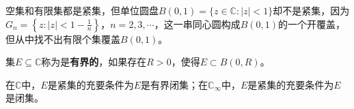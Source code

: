 \documentclass[../../main.tex]{subfiles}%
\begin{document}
\begin{example}
空集和有限集都是紧集，但单位圆盘\(B(0, 1) = \{ z \in \mathbb{C} : | z | < 1 \}\)却不是紧集，因为\(G_n = \left\{ z : | z | < 1 - \frac{1}{n} \right\}\)，\(n = 2, 3, \cdots\)，这一串同心圆构成\(B(0, 1)\)的一个开覆盖，但从中找不出有限个集覆盖\(B(0, 1)\)。
\end{example}

\begin{definition}
集\(E\subseteq \mathbb{C}\)称为是\textbf{有界的}，如果存在\(R > 0\)，使得\(E \subset B(0, R)\)。
\end{definition}

\begin{theorem}\label{theorem:Heine-Borel定理}
在\(\mathbb{C}\)中，\(E\)是紧集的充要条件为\(E\)是有界闭集；在\(\mathbb{C}_\infty\)中，\(E\)是紧集的充要条件为\(E\)是闭集。
\end{theorem}
\end{document}
